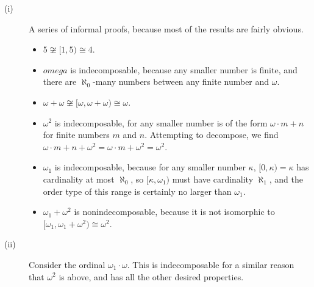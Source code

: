 \documentclass[12pt]{article}
\begin{document}
\begin{description}
\item[(i)] A series of informal proofs, because most of the results are
fairly obvious.
 \begin{itemize}
 \item $5 \not\cong [1,5) \cong 4$.
 \item $omega$ is indecomposable, because any smaller number is finite,
 and there are $\aleph_0$-many numbers between any finite number and
 $\omega$.
 \item $\omega+\omega \not\cong [\omega,\omega+\omega) \cong \omega$.
 \item $\omega^2$ is indecomposable, for any smaller number is of the
 form $\omega \cdot m + n$ for finite numbers $m$ and $n$.  Attempting
 to decompose, we find $\omega \cdot m + n + \omega^2 = \omega \cdot m
 + \omega^2 = \omega^2$.
 \item $\omega_1$ is indecomposable, because for any smaller number
 $\kappa$, $[0,\kappa) = \kappa$ has cardinality at most $\aleph_0$, so
 $[\kappa,\omega_1)$ must have cardinality $\aleph_1$, and the order
 type of this range is certainly no larger than $\omega_1$.
 \item $\omega_1 + \omega^2$ is nonindecomposable, because it is
 not isomorphic to $[\omega_1,\omega_1+\omega^2) \cong \omega^2$.
 \end{itemize}
\item[(ii)] Consider the ordinal $\omega_1 \cdot \omega$.  This is
indecomposable for a similar reason that $\omega^2$ is above, and has
all the other desired properties.
\end{description}
\end{document}
